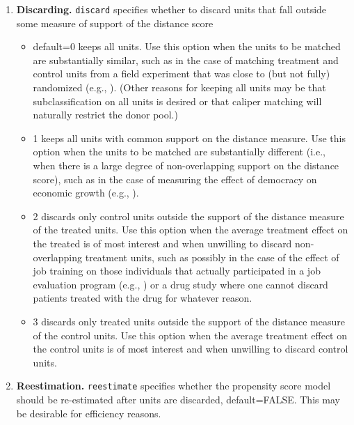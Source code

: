 \documentclass[oneside,letterpaper,titlepage]{article}
\begin{document}
\begin{enumerate}
\item \textbf{Discarding.} \texttt{discard} specifies whether to discard units that
  fall outside some measure of support of the distance score
  \begin{itemize}
  \item default=0 keeps all units.  Use this
    option when the units to be matched are substantially similar,
    such as in the case of matching treatment and control units from a
    field experiment that was close to (but not fully) randomized
    (e.g., \citealt{Imai03}).  (Other reasons for
    keeping all units may be that subclassification on all units is
    desired or that caliper matching will naturally restrict the donor
    pool.)
  \item  1 keeps all units with common support on the distance
    measure. Use this option when the units to be
    matched are substantially different (i.e., when there is a large
    degree of non-overlapping support on the distance score), such as
    in the case of measuring the effect of democracy on economic
    growth (e.g., \citealt{KinZen03}).  
  \item 2 discards only control units outside the support of the
    distance measure of the treated units.
    Use this option when the average treatment effect on the treated
    is of most interest and when unwilling to discard non-overlapping
    treatment units, such as possibly in the case of the effect of job
    training on those individuals that actually participated in a job
    evaluation program (e.g., \citealt{HecIchTod98}) or a drug study
    where one cannot discard patients treated with the drug for
    whatever reason. 
  \item 3 discards only treated units outside the support of 
    the distance measure of the control units.  Use this option when
    the average treatment effect on the control units is of most
    interest and when unwilling to discard control units. 
  \end{itemize}

\item \textbf{Reestimation.} \texttt{reestimate} specifies whether the
  propensity score model should be re-estimated after units are
  discarded, default=FALSE.  This may be desirable for efficiency
  reasons. 


\end{enumerate}
\end{document}
